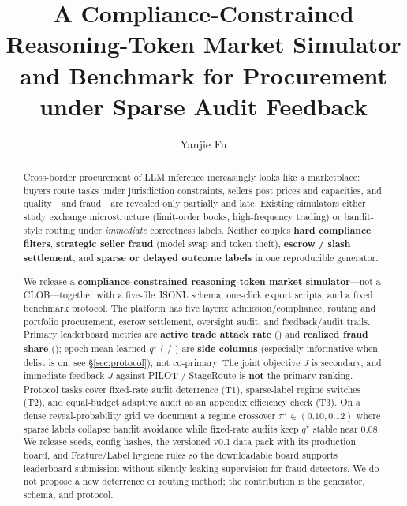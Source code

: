 \documentclass[sigconf,review]{acmart}
\newcommand{\qstar}{q^\star}
\newcommand{\pistar}{\pi^\star}
\begin{document}
\title{A Compliance-Constrained Reasoning-Token Market Simulator and Benchmark for Procurement under Sparse Audit Feedback}

\author{Yanjie Fu}
\renewcommand{\shortauthors}{Yanjie Fu}

\begin{abstract}
Cross-border procurement of LLM inference increasingly looks like a marketplace: buyers route tasks under jurisdiction constraints, sellers post prices and capacities, and quality---and fraud---are revealed only partially and late. Existing simulators either study exchange microstructure (limit-order books, high-frequency trading) or bandit-style routing under \emph{immediate} correctness labels. Neither couples \textbf{hard compliance filters}, \textbf{strategic seller fraud} (model swap and token theft), \textbf{escrow / slash settlement}, and \textbf{sparse or delayed outcome labels} in one reproducible generator.

We release a \textbf{compliance-constrained reasoning-token market simulator}---not a CLOB---together with a five-file JSONL schema, one-click export scripts, and a fixed benchmark protocol. The platform has five layers: admission/compliance, routing and portfolio procurement, escrow settlement, oversight audit, and feedback/audit trails. Primary leaderboard metrics are \textbf{active trade attack rate} () and \textbf{realized fraud share} (); epoch-mean learned $\qstar$ ( / ) are \textbf{side columns} (especially informative when delist is on; see \S\ref{sec:protocol}), not co-primary. The joint objective $J$ is secondary, and immediate-feedback $J$ against PILOT / StageRoute is \textbf{not} the primary ranking. Protocol tasks cover fixed-rate audit deterrence (T1), sparse-label regime switches (T2), and equal-budget adaptive audit as an appendix efficiency check (T3).
On a dense reveal-probability grid we document a regime crossover $\pistar \in (0.10, 0.12)$ where sparse labels collapse bandit avoidance while fixed-rate audits keep $\qstar$ stable near $0.08$. We release seeds, config hashes, the versioned v0.1 data pack with its production board, and Feature/Label hygiene rules so the downloadable board supports leaderboard submission without silently leaking supervision for fraud detectors.
We do not propose a new deterrence or routing method; the contribution is the generator, schema, and protocol.
\end{abstract}
\end{document}
